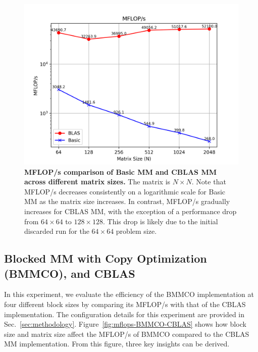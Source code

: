 \begin{figure}[htbp]
    \centering
    \includegraphics[width=1.0\linewidth]{images/Basic-MM-and-CBLAS_MFLOPs.png}
    \caption{\textbf{MFLOP/s comparison of Basic MM and CBLAS MM across different matrix sizes.} The matrix is \(N \times N\). Note that MFLOP/s decreases consistently on a logarithmic scale for Basic MM as the matrix size increases. In contrast, MFLOP/s gradually increases for CBLAS MM, with the exception of a performance drop from \(64 \times 64\) to \(128 \times 128\). This drop is likely due to the initial discarded run for the \(64 \times 64\) problem size.}
    \label{fig:mflops-Basic-CBLAS}
\end{figure}

\subsection{Blocked MM with Copy Optimization (BMMCO), and CBLAS}
\label{subsec:bmmco-and-cblas}

In this experiment, we evaluate the efficiency of the BMMCO implementation at four different block sizes by comparing its MFLOP/s with that of the CBLAS implementation. The configuration details for this experiment are provided in Sec.~\ref{sec:methodology}. Figure~\ref{fig:mflops-BMMCO-CBLAS} shows how block size and matrix size affect the MFLOP/s of BMMCO compared to the CBLAS MM implementation. From this figure, three key insights can be derived.

